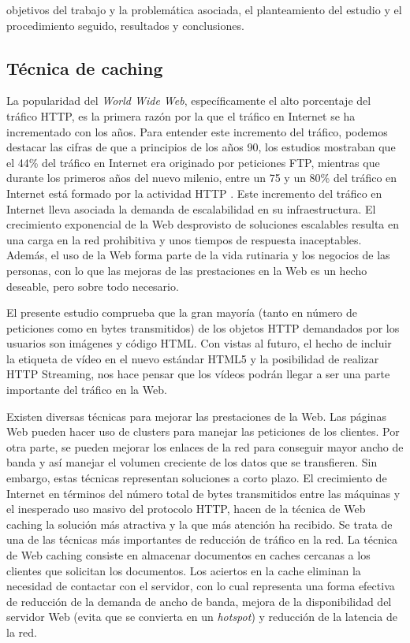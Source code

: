 \documentclass[twocolumn]{Jornadas}
\begin{document}
 objetivos del trabajo y la problemática asociada, el planteamiento
del estudio y el procedimiento seguido, resultados y conclusiones.

\subsection{Técnica de caching}

La popularidad del \emph{World Wide Web}, específicamente el alto porcentaje del tráfico HTTP, es la primera razón por la que el tráfico en Internet se ha incrementado con los años. Para entender este incremento del tráfico, podemos destacar las cifras de que a principios de los años 90, los estudios mostraban que el 44\% del tráfico en Internet era originado por peticiones FTP, mientras que durante los primeros años del nuevo milenio, entre un 75 y un 80\% del tráfico en Internet está formado por la actividad HTTP \cite{barish}. Este incremento del tráfico en Internet lleva asociada la demanda de escalabilidad en su infraestructura. El crecimiento exponencial de la Web desprovisto de soluciones escalables resulta en una carga en la red prohibitiva y unos tiempos de respuesta inaceptables. Además, el uso de la Web forma parte de la vida rutinaria y los negocios de las personas, con lo que las mejoras de las prestaciones en la Web es un hecho deseable, pero sobre todo necesario.

El presente estudio comprueba que la gran mayoría (tanto en número de peticiones como en bytes transmitidos) de los objetos HTTP demandados por los usuarios son imágenes y código HTML. Con vistas al futuro, el hecho de incluir la etiqueta de vídeo en el nuevo estándar HTML5 y la posibilidad de realizar HTTP Streaming, nos hace pensar que los vídeos podrán llegar a ser una parte importante del tráfico en la Web.

Existen diversas técnicas para mejorar las prestaciones de la Web. Las páginas Web pueden hacer uso de clusters para manejar las peticiones de los clientes. Por otra parte, se pueden mejorar los enlaces de la red para conseguir mayor ancho de banda y así manejar el volumen creciente de los datos que se transfieren. Sin embargo, estas técnicas representan soluciones a corto plazo. El crecimiento de Internet en términos del número total de bytes transmitidos entre las máquinas y el inesperado uso masivo del protocolo HTTP, hacen de la técnica de Web caching la solución más atractiva y la que más atención ha recibido. Se trata de una de las técnicas más importantes de reducción de tráfico en la red. La técnica de Web caching consiste en almacenar documentos en caches cercanas a los clientes que solicitan los documentos. Los aciertos en la cache eliminan la necesidad de contactar con el servidor, con lo cual representa una forma efectiva de reducción de la demanda de ancho de banda, mejora de la disponibilidad del servidor Web (evita que se convierta en un \emph{hotspot}) y reducción de la latencia de la red.
\end{document}
